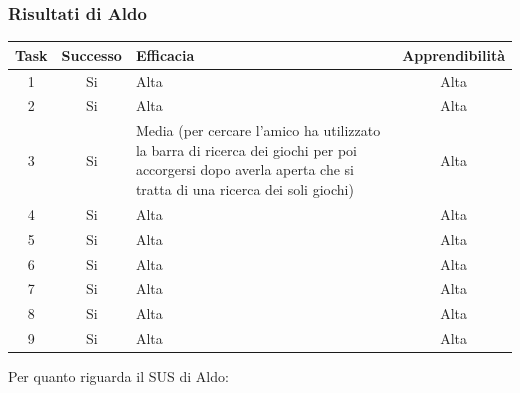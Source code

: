 \documentclass[../Report.tex]{subfiles}
\begin{document}
    \subsubsection{Risultati di Aldo}
    \begin{table}[H]
        \begin{tabular}{|c|c|p{5cm}|c|}
            \hline
            Task & Successo & Efficacia & Apprendibilità \\
            \hline
            1 & Si & Alta & Alta \\
            \hline
            2 & Si & Alta & Alta \\
            \hline
            3 & Si & Media (per cercare l'amico ha utilizzato la barra di ricerca dei giochi per poi accorgersi dopo averla aperta che si tratta di una ricerca dei soli giochi) & Alta \\
            \hline
            4 & Si & Alta  & Alta \\
            \hline
            5 & Si  & Alta & Alta \\
            \hline
            6 & Si & Alta  & Alta \\
            \hline
            7 & Si & Alta & Alta \\
            \hline
            8 & Si & Alta & Alta \\
            \hline
            9 & Si & Alta & Alta \\
            \hline
        \end{tabular}
    \end{table}
    Per quanto riguarda il SUS di Aldo:
\end{document}
